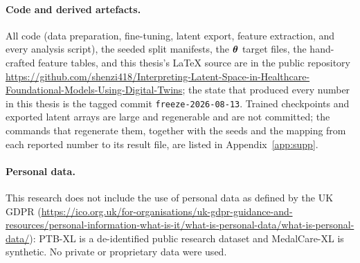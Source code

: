 \paragraph{Code and derived artefacts.} All code (data preparation, fine-tuning, latent export, feature extraction, and every analysis script), the seeded split manifests, the $\boldsymbol{\theta}$ target files, the hand-crafted feature tables, and this thesis's LaTeX source are in the public repository \url{https://github.com/shenzi418/Interpreting-Latent-Space-in-Healthcare-Foundational-Models-Using-Digital-Twins}; the state that produced every number in this thesis is the tagged commit \texttt{freeze-2026-08-13}. Trained checkpoints and exported latent arrays are large and regenerable and are not committed; the commands that regenerate them, together with the seeds and the mapping from each reported number to its result file, are listed in Appendix~\ref{app:supp}. 

\paragraph{Personal data.} This research does not include the use of personal data as defined by the UK GDPR (\url{https://ico.org.uk/for-organisations/uk-gdpr-guidance-and-resources/personal-information-what-is-it/what-is-personal-data/what-is-personal-data/}): PTB-XL is a de-identified public research dataset and MedalCare-XL is synthetic. No private or proprietary data were used.
